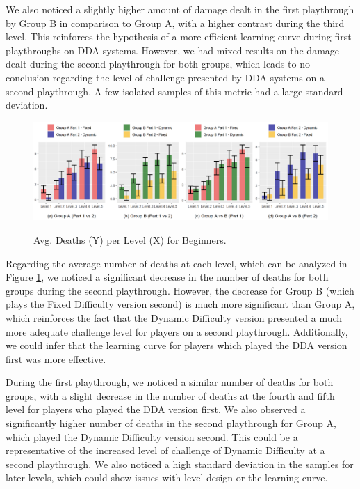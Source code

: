 We also noticed a slightly higher amount of damage dealt in the first playthrough by Group B in comparison to Group A, with a higher contrast during the third level. This reinforces the hypothesis of a more efficient learning curve during first playthroughs on DDA systems. However, we had mixed results on the damage dealt during the second playthrough for both groups, which leads to no conclusion regarding the level of challenge presented by DDA systems on a second playthrough. A few isolated samples of this metric had a large standard deviation.

\begin{figure}[ht]
    \begin{center}
    \caption{Avg. Deaths (Y) per Level (X) for Beginners.}
        \includegraphics[width=\textwidth]{figures/deaths_per_level-beginner_players.png}
        \label{fig:result-metric-beginners-deaths-per-level}
    \end{center}
\end{figure}

Regarding the average number of deaths at each level, which can be analyzed in Figure \ref{fig:result-metric-beginners-deaths-per-level}, we noticed a significant decrease in the number of deaths for both groups during the second playthrough. However, the decrease for Group B (which plays the Fixed Difficulty version second) is much more significant than Group A, which reinforces the fact that the Dynamic Difficulty version presented a much more adequate challenge level for players on a second playthrough. Additionally, we could infer that the learning curve for players which played the DDA version first was more effective.

During the first playthrough, we noticed a similar number of deaths for both groups, with a slight decrease in the number of deaths at the fourth and fifth level for players who played the DDA version first. We also observed a significantly higher number of deaths in the second playthrough for Group A, which played the Dynamic Difficulty version second. This could be a representative of the increased level of challenge of Dynamic Difficulty at a second playthrough. We also noticed a high standard deviation in the samples for later levels, which could show issues with level design or the learning curve.

